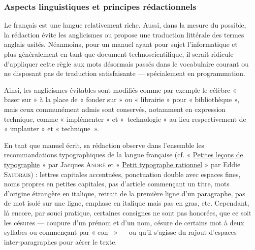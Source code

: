 \subsubsection*{Aspects linguistiques et principes rédactionnels}

Le français est une langue relativement riche. Aussi, dans la mesure du possible, la rédaction évite les anglicismes ou propose une traduction littérale des termes anglais usités. Néanmoins, pour un manuel ayant pour sujet l'informatique et plus généralement en tant que document technoscientifique, il serait ridicule d'appliquer cette règle aux mots désormais passés dans le vocabulaire courant ou ne disposant pas de traduction satisfaisante --- spécialement en programmation. %

Ainsi, les anglicismes évitables sont modifiés comme par exemple le célèbre « baser sur » à la place de « fonder sur » ou « librairie » pour « bibliothèque », mais ceux communément admis sont conservés, notamment en expression technique, comme « implémenter » et «~technologie » au lieu respectivement de « implanter » et « technique~».

En tant que manuel écrit, sa rédaction observe dans l'ensemble les recommandations typographiques de la langue française (cf. « \href{http://jacques-andre.fr/faqtypo/lessons.pdf}{Petites leçons de typographie} » par Jacques \textsc{André} et « \href{http://tex.loria.fr/typographie/saudrais-typo.pdf}{Petit typographe rationnel} » par Eddie \textsc{Saudrais}) : lettres capitales accentuées, ponctuation double avec espaces fines, noms propres en petites capitales, pas d'article commençant un titre, mots d'origine étrangère en italique, retrait de la première ligne d'un paragraphe, pas de mot isolé sur une ligne, emphase en italique mais pas en gras, etc. Cependant, là encore, par souci pratique, certaines consignes ne sont pas honorées, que ce soit les césures --- coupure d'un prénom et d'un nom, césure de certains mot à deux syllabes ou commençant par « con-~» --- ou qu'il s'agisse du rajout d'espaces inter-paragraphes pour aérer le texte.

